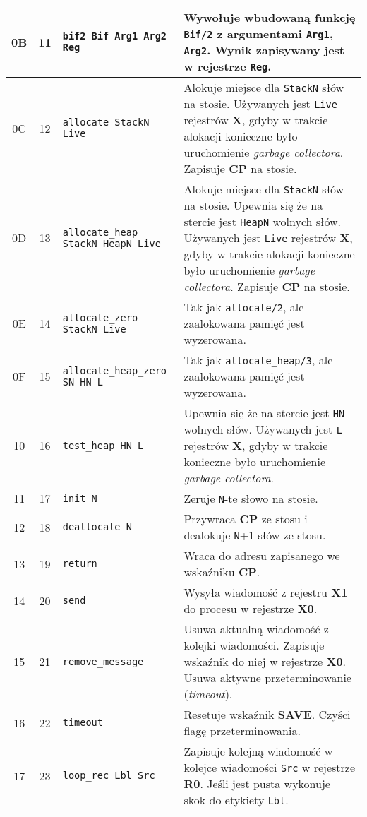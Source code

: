 \begin{longtable}{|c|c|p{5cm}|p{7cm}|}
\hline
0B & 11 & \texttt{bif2 Bif Arg1 Arg2 Reg} & Wywołuje wbudowaną funkcję \texttt{Bif/2} z argumentami \texttt{Arg1}, \texttt{Arg2}. Wynik zapisywany jest w rejestrze \texttt{Reg}. \\
\hline
0C & 12 & \texttt{allocate StackN Live} & Alokuje miejsce dla \texttt{StackN} słów na stosie. Używanych jest \texttt{Live} rejestrów \textbf{X}, gdyby w trakcie alokacji konieczne było uruchomienie \emph{garbage collectora}. Zapisuje \textbf{CP} na stosie. \\
\hline
0D & 13 & \texttt{allocate\_heap StackN HeapN Live} & Alokuje miejsce dla \texttt{StackN} słów na stosie. Upewnia się że na stercie jest \texttt{HeapN} wolnych słów. Używanych jest \texttt{Live} rejestrów \textbf{X}, gdyby w trakcie alokacji konieczne było uruchomienie \emph{garbage collectora}. Zapisuje \textbf{CP} na stosie. \\
\hline
0E & 14 & \texttt{allocate\_zero StackN Live} & Tak jak \texttt{allocate/2}, ale zaalokowana pamięć jest wyzerowana. \\
\hline
0F & 15 & \texttt{allocate\_heap\_zero SN HN L} & Tak jak \texttt{allocate\_heap/3}, ale zaalokowana pamięć jest wyzerowana. \\
\hline
10 & 16 & \texttt{test\_heap HN L} & Upewnia się że na stercie jest \texttt{HN} wolnych słów. Używanych jest \texttt{L} rejestrów \textbf{X}, gdyby w trakcie konieczne było uruchomienie \emph{garbage collectora}.\\
\hline
11 & 17 & \texttt{init N} & Zeruje \texttt{N}-te słowo na stosie.\\
\hline
12 & 18 & \texttt{deallocate N} & Przywraca \textbf{CP} ze stosu i dealokuje \texttt{N}+1 słów ze stosu.\\
\hline
13 & 19 & \texttt{return} & Wraca do adresu zapisanego we wskaźniku \textbf{CP}.\\
\hline
14 & 20 & \texttt{send} & Wysyła wiadomość z rejestru \textbf{X1} do procesu w rejestrze \textbf{X0}. \\
\hline
15 & 21 & \texttt{remove\_message} & Usuwa aktualną wiadomość z kolejki wiadomości. Zapisuje wskaźnik do niej w rejestrze \textbf{X0}. Usuwa aktywne przeterminowanie (\emph{timeout}). \\
\hline
16 & 22 & \texttt{timeout} & Resetuje wskaźnik \textbf{SAVE}. Czyści flagę przeterminowania. \\
\hline
17 & 23 & \texttt{loop\_rec Lbl Src} & Zapisuje kolejną wiadomość w kolejce wiadomości \texttt{Src} w rejestrze \textbf{R0}. Jeśli jest pusta wykonuje skok do etykiety \texttt{Lbl}. \\

\end{longtable}
